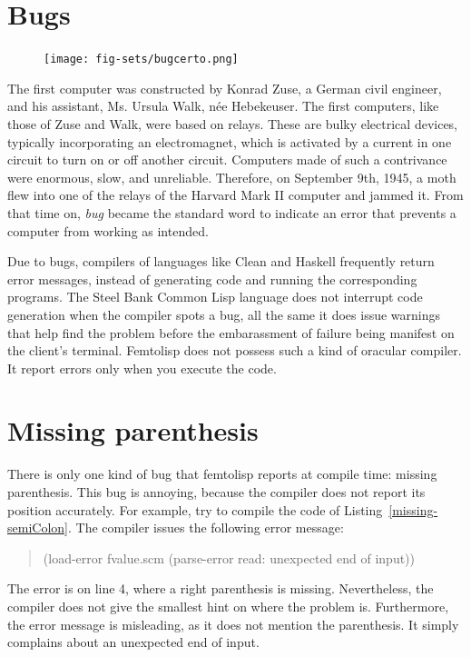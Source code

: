 \documentclass[a4paper,12pt]{book}
\begin{document}
\section{Bugs}
\begin{figure}
\texttt{[image: fig-sets/bugcerto.png]}
\end{figure}
The first computer was 
constructed
by Konrad Zuse,
a German civil engineer, and his assistant,
Ms. Ursula Walk, née Hebekeuser.
The first computers, like those of Zuse and Walk,
were based on relays.
These are
bulky electrical devices, typically incorporating
an electromagnet, which is activated by a current
in one circuit to turn on or off another circuit.
Computers made of such a contrivance were enormous,
slow, and unreliable. Therefore, on September 9th, 1945,
a moth flew into one of the relays of the Harvard  Mark II
computer and jammed it. From that time on,   {\em bug}
became the standard word to indicate
an error that prevents a computer from working as intended.

Due to bugs, compilers of languages like Clean
and Haskell frequently return error messages,
instead of generating code and running the
corresponding programs. The Steel Bank Common Lisp language
does not interrupt code generation when the
compiler spots a bug, all the same
it does issue warnings
that help find the problem before the embarassment
of failure being manifest on the client's terminal.
Femtolisp does not possess such a kind of oracular
compiler. It report errors only when you execute
the code.


\section{Missing parenthesis}
There is only one kind of bug that femtolisp
reports at compile
time: missing parenthesis.
This bug  is annoying, because the compiler
does not  report its position accurately.
For example, try to compile the code of Listing~\ref{missing-semiColon}.
The compiler issues the
following error message:
\begin{quote}
(load-error fvalue.scm (parse-error read: unexpected end of input))
\end{quote}
The error is on line 4, where a right parenthesis is missing.
Nevertheless, the compiler does not give the smallest
hint on where the problem is. Furthermore, the
error message is misleading,
as it does not mention the parenthesis.
It simply complains about an unexpected end of input.
\end{document}
